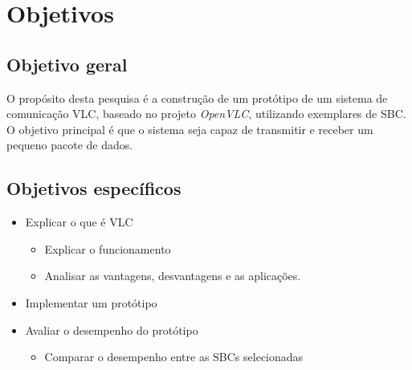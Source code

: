 \chapter{Objetivos} \label{obj}
\section{Objetivo geral}

O propósito desta pesquisa é a construção de um protótipo de um sistema de
comunicação VLC, baseado no projeto \textit{OpenVLC}, utilizando exemplares de SBC. O objetivo principal é que o sistema seja capaz de transmitir e receber um pequeno pacote de dados.

\section{Objetivos específicos}

\begin{itemize}

  \item Explicar o que é VLC
    \begin{itemize}
      \item Explicar o funcionamento
      \item Analisar as vantagens, desvantagens e as aplicações.
    \end{itemize}

  \item Implementar um protótipo
  \item Avaliar o desempenho do protótipo
    \begin{itemize}
      \item Comparar o desempenho entre as SBCs selecionadas
    \end{itemize}

\end{itemize}

